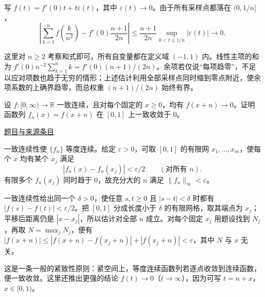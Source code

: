 \documentclass[12pt,fontset=fandol]{ctexart}
\begin{document}
\begin{solve}\label{ans:fin01-all:5}

写 $f(t)=f'(0)t+t\varepsilon(t)$，其中 $\varepsilon(t)\to0$。由于所有采样点都落在 $(0,1/n]$，
\[
\left|\sum_{k=1}^n f\!\left(\frac{k}{n^2}\right)
-f'(0)\frac{n+1}{2n}\right|
\le\frac{n+1}{2n}\sup_{0<t\le1/n}|\varepsilon(t)|\longrightarrow0.
\]

这里对 $n\ge2$ 考察和式即可，所有自变量都在定义域 $(-1,1)$ 内。线性主项的和为 $f'(0)n^{-2}\sum_{k=1}^nk=f'(0)(n+1)/(2n)$。余项若仅说“每项趋零”，不足以应对项数也趋于无穷的情形；上述估计利用全部采样点同时缩到零点附近，使余项系数的上确界趋零，而总权重 $(n+1)/(2n)$ 始终有界。

\end{solve}

\begin{example}[来源序号6]\label{ex:fin01-all:6}\label{pr:fin01-all:6}

设 $f:[0,\infty)\to\mathbb R$ 一致连续，且对每个固定的 $x\ge0$，均有 $f(x+n)\to0$。证明函数列 $f_n(x)=f(x+n)$ 在 $[0,1]$ 上一致收敛于 $0$。

\par\href{https://github.com/lzxcr/cmc-mathematics/blob/64916fa1fdbc3e444a652eca204d5669058ee321/src/problems/finals/01/06.md}{题目与来源条目}

\end{example}

\begin{solve}\label{ans:fin01-all:6}

一致连续性使 $\{f_n\}$ 等度连续。给定 $\varepsilon>0$，可取 $[0,1]$ 的有限网 $x_1,\ldots,x_m$，使每个 $x$ 均有某个 $x_j$ 满足
\[
|f_n(x)-f_n(x_j)|<\varepsilon/2\qquad(\text{对所有 }n).
\]
有限多个 $f_n(x_j)$ 同时趋于 $0$，故充分大的 $n$ 满足 $\|f_n\|_\infty<\varepsilon$。

一致连续性给出同一个 $\delta>0$，使任意 $s,t\ge0$ 且 $|s-t|<\delta$ 时都有 $|f(s)-f(t)|<\varepsilon/2$。把 $[0,1]$ 分成长度小于 $\delta$ 的有限网格，取其端点为 $x_j$；平移后距离仍是 $|x-x_j|$，所以估计对全部 $n$ 成立。对每个固定 $x_j$ 用题设找到 $N_j$，再取 $N=\max_jN_j$，便有 $|f(x+n)|\le|f(x+n)-f(x_j+n)|+|f(x_j+n)|<\varepsilon$，其中 $N$ 与 $x$ 无关。

\end{solve}

\begin{remark}[方法与条件]这是一条一般的紧致性原则：紧空间上，等度连续函数列若逐点收敛到连续函数，便一致收敛。这里还推出更强的结论 $f(t)\to0$（$t\to\infty$），因为可写 $t=n+x$，$x\in[0,1)$。\end{remark}
\end{document}
